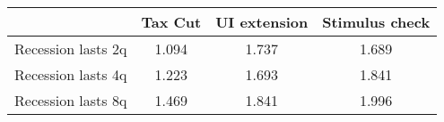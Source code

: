 \begin{tabular}{@{}lccc@{}} 
\toprule 
& Tax Cut    & UI extension    & Stimulus check    \\  \midrule 
Recession lasts 2q &1.094  & 1.737  & 1.689     \\ 
Recession lasts 4q &1.223  & 1.693  & 1.841     \\ 
Recession lasts 8q &1.469  & 1.841  & 1.996     \\ 
\end{tabular}  
